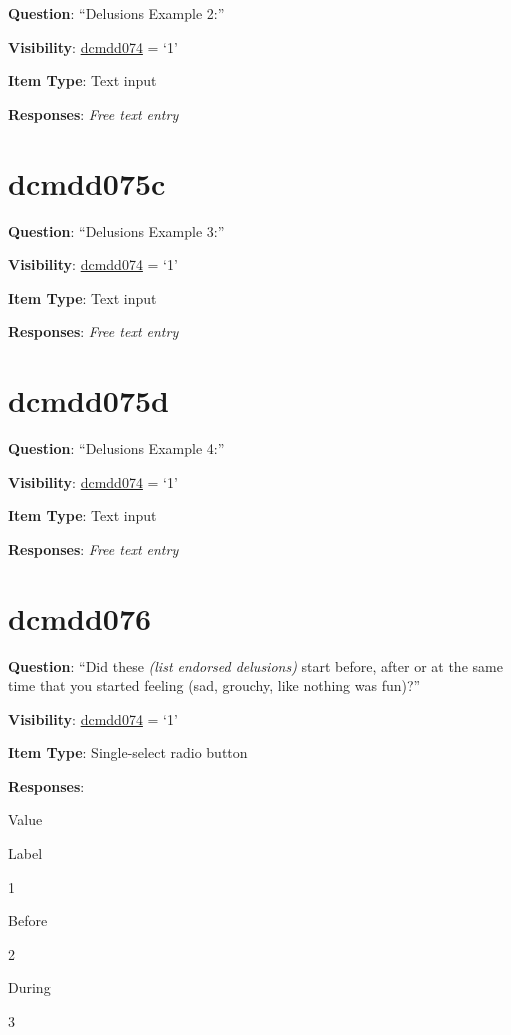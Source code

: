 \documentclass[]{book}
\begin{document}
\textbf{Question}: ``Delusions Example 2:''

\textbf{Visibility}: \protect\hyperlink{dcmdd074}{dcmdd074} = `1'

\textbf{Item Type}: Text input

\textbf{Responses}: \emph{Free text entry}

\hypertarget{dcmdd075c}{%
\section{dcmdd075c}\label{dcmdd075c}}

\textbf{Question}: ``Delusions Example 3:''

\textbf{Visibility}: \protect\hyperlink{dcmdd074}{dcmdd074} = `1'

\textbf{Item Type}: Text input

\textbf{Responses}: \emph{Free text entry}

\hypertarget{dcmdd075d}{%
\section{dcmdd075d}\label{dcmdd075d}}

\textbf{Question}: ``Delusions Example 4:''

\textbf{Visibility}: \protect\hyperlink{dcmdd074}{dcmdd074} = `1'

\textbf{Item Type}: Text input

\textbf{Responses}: \emph{Free text entry}

\hypertarget{dcmdd076}{%
\section{dcmdd076}\label{dcmdd076}}

\textbf{Question}: ``Did these \emph{(list endorsed delusions)} start before, after or at the same time that you started feeling (sad, grouchy, like nothing was fun)?''

\textbf{Visibility}: \protect\hyperlink{dcmdd074}{dcmdd074} = `1'

\textbf{Item Type}: Single-select radio button

\textbf{Responses}:

Value

Label

1

Before

2

During

3
\end{document}
